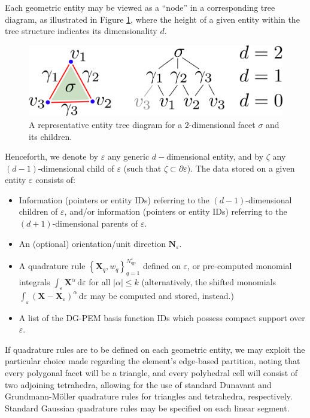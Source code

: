 	Each geometric entity may be viewed as a ``node'' in a corresponding tree diagram, as illustrated in Figure \ref{fig:entity_tree}, where the height of a given entity within the tree structure indicates its dimensionality $d$.
	\begin{figure} [!ht]
		\centering
		\includegraphics[width = 5.0in]{figures/entity_tree.pdf}
		\caption{A representative entity tree diagram for a $2$-dimensional facet $\sigma$ and its children.}
		\label{fig:entity_tree}
	\end{figure}
	
	Henceforth, we denote by $\varepsilon$ any generic $d-$dimensional entity, and by $\zeta$ any $(d-1)$-dimensional child of $\varepsilon$ (such that $\zeta \subset \partial \varepsilon$). The data stored on a given entity $\varepsilon$ consists of:
	\begin{itemize}
		\item Information (pointers or entity IDs) referring to the $(d-1)$-dimensional children of $\varepsilon$, and/or information (pointers or entity IDs) referring to the $(d+1)$-dimensional parents of $\varepsilon$.
		\item An (optional) orientation/unit direction $\bm{N}_\varepsilon$.
		\item A quadrature rule $\left\{ \bm{X}_q, w_q \right\}_{q=1}^{N^{\varepsilon}_{\mathrm q\mathrm p}}$ defined on $\varepsilon$, or pre-computed monomial integrals $\int_{\varepsilon} \bm{X}^\alpha \, \mathrm d \varepsilon$ for all $|\alpha| \leq k$ (alternatively, the shifted monomials $\int_{\varepsilon} (\bm{X}-\bm{X}_{\varepsilon})^\alpha \, \mathrm d \varepsilon$ may be computed and stored, instead.)
		\item A list of the DG-PEM basis function IDs which possess compact support over $\varepsilon$.
	\end{itemize}
	
	If quadrature rules are to be defined on each geometric entity, we may exploit the particular choice made regarding the element's edge-based partition, noting that every polygonal facet will be a triangle, and every polyhedral cell will consist of two adjoining tetrahedra, allowing for the use of standard Dunavant \cite{Dunavant:85} and Grundmann-M\"{o}ller \cite{Grundmann:78} quadrature rules for triangles and tetrahedra, respectively. Standard Gaussian quadrature rules may be specified on each linear segment.
	
